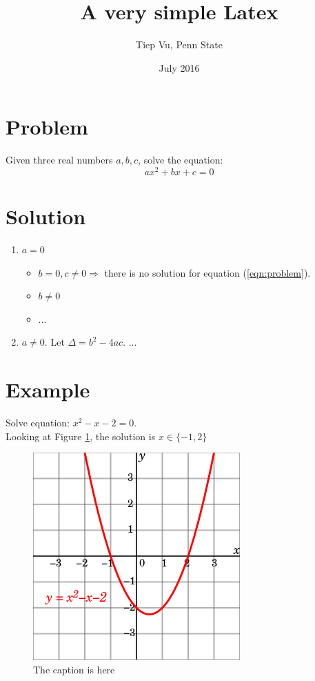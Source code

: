\documentclass[10pt]{article}
\title{A very simple Latex}
\author{Tiep Vu, Penn State}
\date{July 2016}
\begin{document}
\maketitle
\section{Problem} %
\label{sec:problem}
Given three real numbers $a, b, c$, solve the equation: 
\begin{equation}
	\label{eqn:problem}
    ax^2 + bx + c = 0
\end{equation}
\section{Solution} %
\label{sec:solution}
\begin{enumerate}
	\item $a = 0$
		\begin{itemize}
			\item $b = 0, c \neq 0 \Rightarrow$ there is no solution for equation (\ref{eqn:problem}).

			\item $b \neq 0 $
			\item ...
		\end{itemize}

	\item $a \neq 0$. Let $\Delta = b^2 - 4ac.$ ...
\end{enumerate}

\section{Example} %
\label{sec:example}
Solve equation: $x^2 - x - 2 = 0$. \\
Looking at Figure \ref{fig:example1}, the solution is $x \in \{-1, 2\}$
\begin{figure}[h]
\label{fig:example1}
\centering	
	\includegraphics[scale = 0.4]{figs/fig1.png}
	\caption{The caption is here}
\end{figure}
\end{document}
